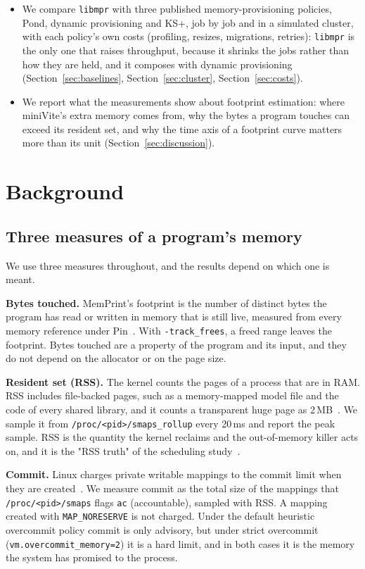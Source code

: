 \documentclass[11pt]{article}
\newcommand{\memprint}{MemPrint}
\newcommand{\libmpr}{\texttt{libmpr}}
\newcommand{\secref}[1]{Section~\ref{#1}}
\begin{document}
\begin{itemize}
  \item We compare \libmpr{} with three published memory-provisioning policies, Pond, dynamic provisioning and
  KS+, job by job and in a simulated cluster, with each policy's own costs (profiling, resizes, migrations,
  retries): \libmpr{} is the only one that raises throughput, because it shrinks the jobs rather than how they
  are held, and it composes with dynamic provisioning (\secref{sec:baselines}, \secref{sec:cluster},
  \secref{sec:costs}).
  \item We report what the measurements show about footprint estimation: where miniVite's extra memory comes
  from, why the bytes a program touches can exceed its resident set, and why the time axis of a footprint
  curve matters more than its unit (\secref{sec:discussion}).
\end{itemize}

\section{Background}
\label{sec:background}

\subsection{Three measures of a program's memory}

We use three measures throughout, and the results depend on which one is meant.

\textbf{Bytes touched.} \memprint{}'s footprint is the number of distinct bytes the program has read or
written in memory that is still live, measured from every memory reference under Pin~\cite{memprint}. With
\texttt{-track\_frees}, a freed range leaves the footprint. Bytes touched are a property of the program and its
input, and they do not depend on the allocator or on the page size.

\textbf{Resident set (RSS).} The kernel counts the pages of a process that are in RAM. RSS includes file-backed
pages, such as a memory-mapped model file and the code of every shared library, and it counts a transparent
huge page as 2\,MB~\cite{LinuxTHP}. We sample it from \texttt{/proc/<pid>/smaps\_rollup} every 20\,ms and report
the peak sample. RSS is the quantity the kernel reclaims and the out-of-memory killer acts on, and it is the
"RSS truth" of the scheduling study~\cite{memprintsched}.

\textbf{Commit.} Linux charges private writable mappings to the commit limit when they are
created~\cite{LinuxOvercommit}. We measure commit as the total size of the mappings that
\texttt{/proc/<pid>/smaps} flags \texttt{ac} (accountable), sampled with RSS. A mapping created with
\texttt{MAP\_NORESERVE} is not charged. Under the default heuristic overcommit policy commit is only advisory,
but under strict overcommit (\texttt{vm.overcommit\_memory=2}) it is a hard limit, and in both cases it is the
memory the system has promised to the process.
\end{document}
